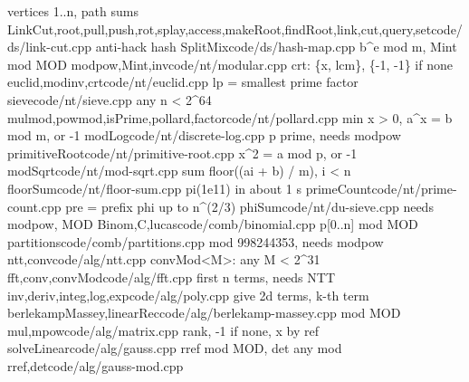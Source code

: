   {vertices 1..n, path sums}
  {LinkCut,root,pull,push,rot,splay,access,makeRoot,findRoot,link,cut,query,set}{code/ds/link-cut.cpp}
  {anti-hack hash}
  {SplitMix}{code/ds/hash-map.cpp}
  {b\textasciicircum{}e mod m, Mint mod MOD}
  {modpow,Mint,inv}{code/nt/modular.cpp}
  {crt: \{x, lcm\}, \{-1, -1\} if none}
  {euclid,modinv,crt}{code/nt/euclid.cpp}
  {lp = smallest prime factor}
  {sieve}{code/nt/sieve.cpp}
  {any n < 2\textasciicircum{}64}
  {mulmod,powmod,isPrime,pollard,factor}{code/nt/pollard.cpp}
  {min x > 0, a\textasciicircum{}x = b mod m, or -1}
  {modLog}{code/nt/discrete-log.cpp}
  {p prime, needs modpow}
  {primitiveRoot}{code/nt/primitive-root.cpp}
  {x\textasciicircum{}2 = a mod p, or -1}
  {modSqrt}{code/nt/mod-sqrt.cpp}
  {sum floor((ai + b) / m), i < n}
  {floorSum}{code/nt/floor-sum.cpp}
  {pi(1e11) in about 1 s}
  {primeCount}{code/nt/prime-count.cpp}
  {pre = prefix phi up to n\textasciicircum{}(2/3)}
  {phiSum}{code/nt/du-sieve.cpp}
  {needs modpow, MOD}
  {Binom,C,lucas}{code/comb/binomial.cpp}
  {p[0..n] mod MOD}
  {partitions}{code/comb/partitions.cpp}
  {mod 998244353, needs modpow}
  {ntt,conv}{code/alg/ntt.cpp}
  {convMod<M>: any M < 2\textasciicircum{}31}
  {fft,conv,convMod}{code/alg/fft.cpp}
  {first n terms, needs NTT}
  {inv,deriv,integ,log,exp}{code/alg/poly.cpp}
  {give 2d terms, k-th term}
  {berlekampMassey,linearRec}{code/alg/berlekamp-massey.cpp}
  {mod MOD}
  {mul,mpow}{code/alg/matrix.cpp}
  {rank, -1 if none, x by ref}
  {solveLinear}{code/alg/gauss.cpp}
  {rref mod MOD, det any mod}
  {rref,det}{code/alg/gauss-mod.cpp}
